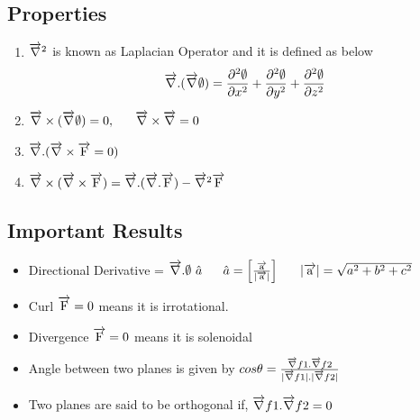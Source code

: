 \subsection*{Properties}
\begin{enumerate}
    \item \(\overrightarrow{\rm \nabla}^2\) is known as Laplacian Operator and it is defined as below
    \[\overrightarrow{\rm \nabla}.(\overrightarrow{\rm \nabla}\emptyset) = \frac{\partial^2 \emptyset}{\partial x^2} + \frac{\partial^2 \emptyset}{\partial y^2} + \frac{\partial^2 \emptyset}{\partial z^2}\]
    \item \(\overrightarrow{\rm \nabla}\times(\overrightarrow{\rm \nabla}\emptyset) = 0,\ \ \ \ \ \overrightarrow{\rm \nabla}\times\overrightarrow{\rm \nabla}=0\)
    \item \(\overrightarrow{\rm \nabla}.(\overrightarrow{\rm \nabla}\times\overrightarrow{\rm F} = 0)\)
    \item \(\overrightarrow{\rm \nabla}\times(\overrightarrow{\rm \nabla}\times\overrightarrow{\rm F})=\overrightarrow{\rm \nabla}.(\overrightarrow{\rm \nabla}.\overrightarrow{\rm F})-\overrightarrow{\rm \nabla}^2\overrightarrow{\rm F}\)
\end{enumerate}

\subsection*{Important Results}
\begin{itemize}
    \item Directional Derivative = \(\overrightarrow{\rm \nabla}.\emptyset\ \hat{a}\ \ \ \ \ \hat{a}=\left[ \frac{\overrightarrow{\rm a}}{|\overrightarrow{\rm a}|} \right]\ \ \ \ \ |\overrightarrow{\rm a}|=\sqrt{a^2 + b^2 + c^2} \)
    \item Curl \(\overrightarrow{\rm F} = 0\) means it is irrotational.
    \item Divergence \(\overrightarrow{\rm F} = 0\) means it is solenoidal
    \item Angle between two planes is given by
    \(cos\theta = \frac{\overrightarrow{\rm \nabla} f1. \overrightarrow{\rm \nabla} f2}{|\overrightarrow{\rm \nabla} f1|.|\overrightarrow{\rm \nabla} f2|}\)
    \item Two planes are said to be orthogonal if, \(\overrightarrow{\rm \nabla} f1. \overrightarrow{\rm \nabla} f2 = 0\)
\end{itemize}

